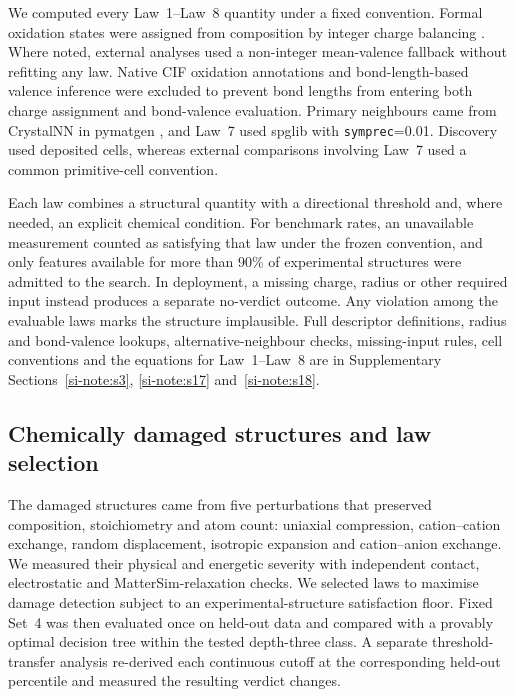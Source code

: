 We computed every Law~1--Law~8 quantity under a fixed convention. Formal oxidation states
were assigned from composition by integer charge balancing \cite{jablonka2021using}. Where
noted, external analyses used a non-integer mean-valence fallback without refitting any
law. Native CIF oxidation annotations and bond-length-based valence inference were excluded
to prevent bond lengths from entering both charge assignment and bond-valence evaluation.
Primary neighbours came from CrystalNN \cite{zimmermann2020local} in pymatgen
\cite{ong2013python}, and Law~7 used spglib \cite{togo2024spglib} with
\texttt{symprec}=0.01. Discovery used deposited cells, whereas external comparisons
involving Law~7 used a common primitive-cell convention.

Each law combines a structural quantity with a directional threshold and, where needed, an
explicit chemical condition. For benchmark rates, an unavailable measurement counted as
satisfying that law under the frozen convention, and only features available for more than
90\% of experimental structures were admitted to the search. In deployment, a missing
charge, radius or other required input instead produces a separate no-verdict outcome. Any
violation among the evaluable laws marks the structure implausible. Full descriptor
definitions, radius and bond-valence lookups, alternative-neighbour checks, missing-input
rules, cell conventions and the equations for Law~1--Law~8 are in Supplementary
Sections~\ref{si-note:s3}, \ref{si-note:s17} and~\ref{si-note:s18}.

\subsection{Chemically damaged structures and law selection}

The damaged structures came from five perturbations that preserved composition,
stoichiometry and atom count: uniaxial compression, cation--cation exchange, random
displacement, isotropic expansion and cation--anion exchange. We measured their physical and energetic
severity with independent contact, electrostatic and MatterSim-relaxation checks. We selected laws to maximise damage detection subject to an experimental-structure
satisfaction floor. Fixed Set~4 was then evaluated once on held-out data and compared with
a provably optimal decision tree within the tested depth-three class. A separate
threshold-transfer analysis re-derived each continuous cutoff at the corresponding held-out
percentile and measured the resulting verdict changes.

